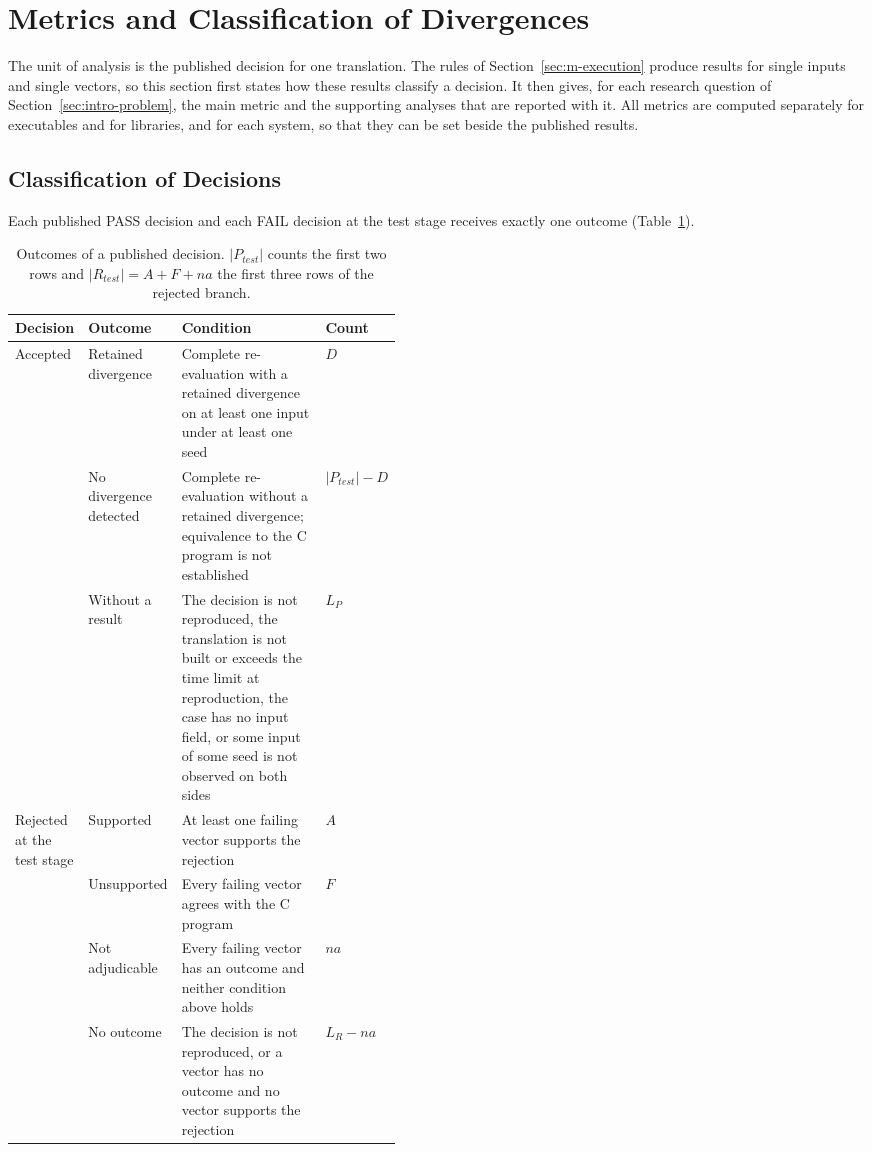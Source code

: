 \section{Metrics and Classification of Divergences}\label{sec:m-measures}

The unit of analysis is the published decision for one translation. The rules of Section~\ref{sec:m-execution} produce results for single inputs and single vectors, so this section first states how these results classify a decision. It then gives, for each research question of Section~\ref{sec:intro-problem}, the main metric and the supporting analyses that are reported with it. All metrics are computed separately for executables and for libraries, and for each system, so that they can be set beside the published results.

\subsection{Classification of Decisions}\label{sec:m-outcomes}

Each published PASS decision and each FAIL decision at the test stage receives exactly one outcome (Table~\ref{tab:m-outcomes}).

\begin{table}[!htb]
\centering
\small
\caption{Outcomes of a published decision. $|P_{\mathit{test}}|$ counts the first two rows and $|R_{\mathit{test}}| = A + F + \mathit{na}$ the first three rows of the rejected branch.}
\label{tab:m-outcomes}
\begin{tabularx}{\linewidth}{@{}p{0.11\linewidth}p{0.21\linewidth}Xp{0.13\linewidth}@{}}
\toprule
Decision & Outcome & Condition & Count \\
\midrule
Accepted & Retained divergence & Complete re-evaluation with a retained divergence on at least one input under at least one seed & $D$ \\
 & No divergence detected & Complete re-evaluation without a retained divergence; equivalence to the C program is not established & $|P_{\mathit{test}}| - D$ \\
 & Without a result & The decision is not reproduced, the translation is not built or exceeds the time limit at reproduction, the case has no input field, or some input of some seed is not observed on both sides & $L_P$ \\
\midrule
Rejected at the test stage & Supported & At least one failing vector supports the rejection & $A$ \\
 & Unsupported & Every failing vector agrees with the C program & $F$ \\
 & Not adjudicable & Every failing vector has an outcome and neither condition above holds & $\mathit{na}$ \\
 & No outcome & The decision is not reproduced, or a vector has no outcome and no vector supports the rejection & $L_R - \mathit{na}$ \\
\bottomrule
\end{tabularx}
\end{table}

